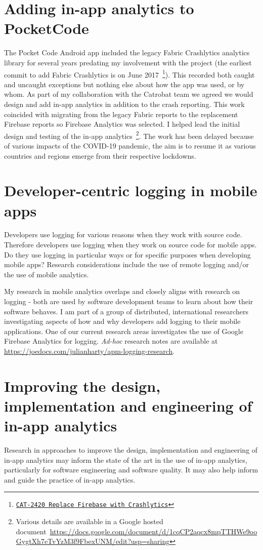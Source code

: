 \section{Adding in-app analytics to PocketCode}
The Pocket Code Android app included the legacy Fabric Crashlytics analytics library for several years predating my involvement with the project (the earliest commit to add Fabric Crashlytics is on  June 2017~\footnote{\href{https://github.com/Catrobat/Catroid/commit/95aa37ff5263402b41b63f50296aabc8c354433e}{\texttt{CAT-2420 Replace Firebase with Crashlytics}}}). This recorded both caught and uncaught exceptions but nothing else about how the app was used, or by whom. As part of my collaboration with the Catrobat team we agreed we would design and add in-app analytics in addition to the crash reporting. This work coincided with migrating from the legacy Fabric reports to the replacement Firebase reports so Firebase Analytics was selected. I helped lead the initial design and testing of the in-app analytics~\footnote{Various details are available in a Google hosted document~\url{https://docs.google.com/document/d/1cqCP2aqcx8mpTTHWe9ooGygtXh7eTvYzM3f9FbexUNM/edit?usp=sharing}}. The work has been delayed because of various impacts of the COVID-19 pandemic, the aim is to resume it as various countries and regions emerge from their respective lockdowns.

\section{Developer-centric logging in mobile apps}
Developers use logging for various reasons when they work with source code. Therefore developers use logging when they work on source code for mobile apps. Do they use logging in particular ways or for specific purposes when developing mobile apps? Research considerations include the use of remote logging and/or the use of mobile analytics.

My research in mobile analytics overlaps and closely aligns with research on logging - both are used by software development teams to learn about how their software behaves. I am part of a group of distributed, international researchers investigating aspects of how and why developers add logging to their mobile applications. One of our current research areas investigates the use of Google Firebase Analytics for logging. \emph{Ad-hoc} research notes are available at \url{https://joedocs.com/julianharty/apm-logging-research}.


\section{Improving the design, implementation and engineering of in-app analytics}
Research in approaches to improve the design, implementation and engineering of in-app analytics may inform the state of the art in the use of in-app analytics, particularly for software engineering and software quality. It may also help inform and guide the practice of in-app analytics. 

